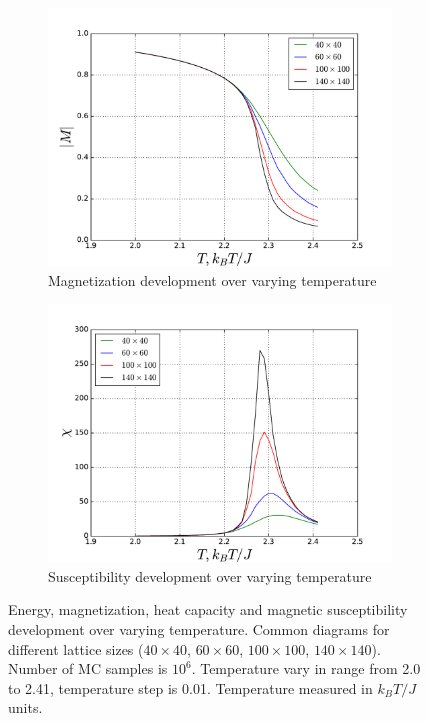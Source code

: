 \documentclass[a4paper]{article}
\begin{document}
\begin{figure}[h!]
  \begin{subfigure}[b]{0.5\linewidth}
    \centering
    \includegraphics[width=1.0\linewidth]{phase_10_6_magnetization} 
    \caption{Magnetization development over varying temperature } 
    \label{fig3:c} 
  \end{subfigure}
  \begin{subfigure}[b]{0.5\linewidth}
    \centering
    \includegraphics[width=1.0\linewidth]{phase_10_6_susceptability} 
    \caption{Susceptibility development over varying temperature } 
    \label{fig3:d} 
  \end{subfigure} 
  \caption{ Energy, magnetization, heat capacity and magnetic susceptibility development over varying temperature. Common diagrams for different lattice sizes ($40 \times 40$, $60 \times 60$, $100 \times 100$, $140 \times 140$). Number of MC samples is $10^6$. Temperature vary in range from 2.0 to 2.41, temperature step is 0.01. Temperature measured in $k_BT/J$ units.}
  \label{fig3} 
\end{figure}
\end{document}

